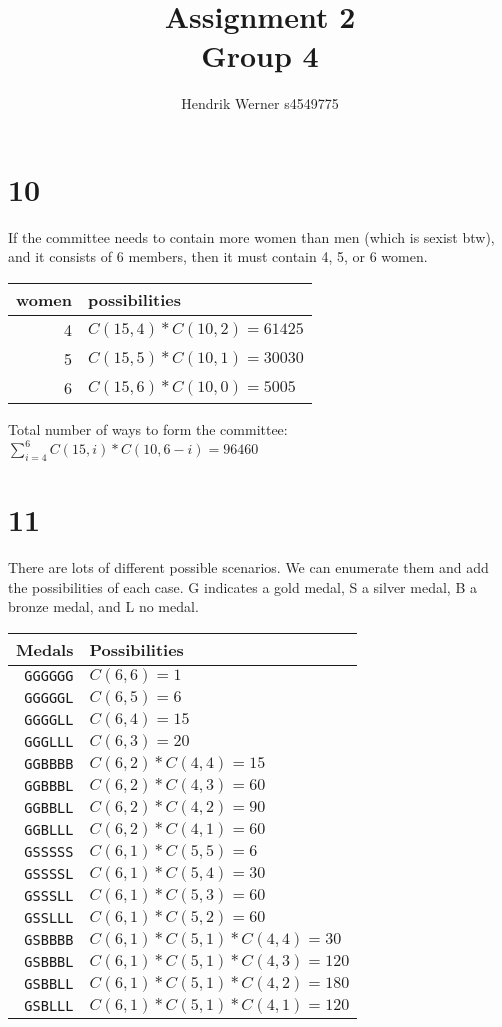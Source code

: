 \documentclass[12pt]{article}
\title{
	Assignment 2\\
	Group 4
}
\author{
	Hendrik Werner s4549775
}
\begin{document}
\maketitle

\section*{10}
If the committee needs to contain more women than men (which is sexist btw), and it consists of 6 members, then it must contain 4, 5, or 6 women.

\begin{tabular}{r|l}
	women & possibilities\\\hline
	4 & $C(15, 4) * C(10, 2) = 61425$\\
	5 & $C(15, 5) * C(10, 1) = 30030$\\
	6 & $C(15, 6) * C(10, 0) = 5005$
\end{tabular}

Total number of ways to form the committee: $\sum_{i=4}^{6} C(15, i) * C(10, 6 - i) = 96460$

\section*{11}
There are lots of different possible scenarios. We can enumerate them and add the possibilities of each case. G indicates a gold medal, S a silver medal, B a bronze medal, and L no medal.

\begin{tabular}{r|l}
	Medals & Possibilities\\\hline
	\texttt{GGGGGG} & $C(6, 6) = 1$\\
	\texttt{GGGGGL} & $C(6, 5) = 6$\\
	\texttt{GGGGLL} & $C(6, 4) = 15$\\
	\texttt{GGGLLL} & $C(6, 3) = 20$\\
	\texttt{GGBBBB} & $C(6, 2) * C(4, 4) = 15$\\
	\texttt{GGBBBL} & $C(6, 2) * C(4, 3) = 60$\\
	\texttt{GGBBLL} & $C(6, 2) * C(4, 2) = 90$\\
	\texttt{GGBLLL} & $C(6, 2) * C(4, 1) = 60$\\
	\texttt{GSSSSS} & $C(6, 1) * C(5, 5) = 6$\\
	\texttt{GSSSSL} & $C(6, 1) * C(5, 4) = 30$\\
	\texttt{GSSSLL} & $C(6, 1) * C(5, 3) = 60$\\
	\texttt{GSSLLL} & $C(6, 1) * C(5, 2) = 60$\\
	\texttt{GSBBBB} & $C(6, 1) * C(5, 1) * C(4, 4) = 30$\\
	\texttt{GSBBBL} & $C(6, 1) * C(5, 1) * C(4, 3) = 120$\\
	\texttt{GSBBLL} & $C(6, 1) * C(5, 1) * C(4, 2) = 180$\\
	\texttt{GSBLLL} & $C(6, 1) * C(5, 1) * C(4, 1) = 120$\\
\end{tabular}
\end{document}
